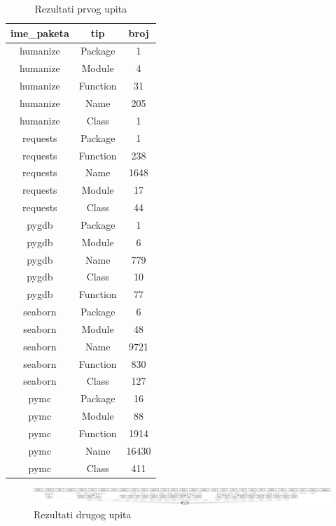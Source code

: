 \begin{table}[h]
\centering
\caption{Rezultati prvog upita}
\begin{tabular}{|c|c|c|}
\hline
ime_paketa & tip & broj \\ \hline
humanize & Package & 1 \\ \hline
humanize & Module & 4 \\ \hline
humanize & Function & 31 \\ \hline
humanize & Name & 205 \\ \hline
humanize & Class & 1 \\ \hline
requests & Package & 1 \\ \hline
requests & Function & 238 \\ \hline
requests & Name & 1648 \\ \hline
requests & Module & 17 \\ \hline
requests & Class & 44 \\ \hline
pygdb & Package & 1 \\ \hline
pygdb & Module & 6 \\ \hline
pygdb & Name & 779 \\ \hline
pygdb & Class & 10 \\ \hline
pygdb & Function & 77 \\ \hline
seaborn & Package & 6 \\ \hline
seaborn & Module & 48 \\ \hline
seaborn & Name & 9721 \\ \hline
seaborn & Function & 830 \\ \hline
seaborn & Class & 127 \\ \hline
pymc & Package & 16 \\ \hline
pymc & Module & 88 \\ \hline
pymc & Function & 1914 \\ \hline
pymc & Name & 16430 \\ \hline
pymc & Class & 411 \\ \hline
\end{tabular}
\label{tab:upit1}
\end{table}

\begin{figure}[h]
    \includegraphics[angle=-90, scale=0.12]{assets/pim.png}
    \centering
    \caption{Rezultati drugog upita}
    \label{fig:upit2}
\end{figure}


